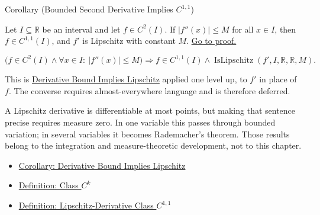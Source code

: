 

\begin{corollarybox}{Corollary (Bounded Second Derivative Implies \(C^{1,1}\))}
\begin{corollary}
\label{cor:bounded-second-derivative-implies-c11}
Let \(I\subseteq\mathbb{R}\) be an interval and let \(f\in C^2(I)\). If
\(|f''(x)|\leq M\) for all \(x\in I\), then \(f\in C^{1,1}(I)\), and \(f'\)
is Lipschitz with constant \(M\).
\hyperref[prf:bounded-second-derivative-implies-c11]{Go to proof.}
\end{corollary}
\end{corollarybox}

\begin{remark*}
\[
  \bigl(f\in C^2(I)\land \forall x\in I:\ |f''(x)|\leq M\bigr)
  \Rightarrow
  f\in C^{1,1}(I)\land \operatorname{IsLipschitz}(f',I,\mathbb{R},\mathbb{R},M).
\]
\end{remark*}

\begin{remark*}[Interpretation]
This is \hyperref[cor:derivative-bound-implies-lipschitz]{Derivative Bound
Implies Lipschitz} applied one level up, to \(f'\) in place of \(f\). The
converse requires almost-everywhere language and is therefore deferred.


A Lipschitz derivative is differentiable at most points, but making that
sentence precise requires measure zero. In one variable this passes through
bounded variation; in several variables it becomes Rademacher's theorem.
Those results belong to the integration and measure-theoretic development,
not to this chapter.
\end{remark*}

\begin{dependencies}
\begin{itemize}
  \item \hyperref[cor:derivative-bound-implies-lipschitz]{Corollary: Derivative Bound Implies Lipschitz}
  \item \hyperref[def:class-ck]{Definition: Class \(C^k\)}
  \item \hyperref[def:class-c11]{Definition: Lipschitz-Derivative Class \(C^{1,1}\)}
\end{itemize}
\end{dependencies}
